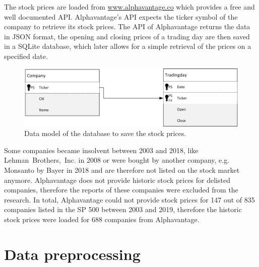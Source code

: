 The stock prices are loaded from \url{www.alphavantage.co} which provides a free and well documented \ac{API}.
Alphavantage's \ac{API} expects the ticker symbol of the company to retrieve its stock prices.
The \ac{API} of Alphavantage returns the data in \ac{JSON} format, the opening and closing prices of a trading day are then saved in a SQLite database, which later allows for a simple retrieval of the prices on a specified date.
\begin{figure}[h]
    \centering
    \includegraphics[width=1\textwidth]{figures/Datenmodell.png}
    \caption{Data model of the database to save the stock prices.}
    \label{figure:data_model}
\end{figure}
Some companies became insolvent between 2003 and 2018, like \mbox{Lehman Brothers, Inc.} in 2008 or were bought by another company, e.g. Monsanto by Bayer in 2018 and are therefore not listed on the stock market anymore.
Alphavantage does not provide historic stock prices for delisted companies, therefore the reports of these companies were excluded from the research.
In total, Alphavantage could not provide stock prices for 147 out of 835 companies listed in the \ac{SP} 500 between 2003 and 2019, therefore the historic stock prices were loaded for 688 companies from Alphavantage.


\section{Data preprocessing}
\label{sec:data_preprocessing}

